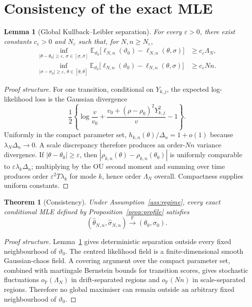 \documentclass[11pt]{article}
\newtheorem{theorem}[assumption]{Theorem}
\newtheorem{lemma}[assumption]{Lemma}
\theoremstyle{remark}
\newcommand{\E}{\mathbb E}
\newcommand{\Pp}{\mathbb P}
\newcommand{\1}{\mathbf 1}
\newcommand{\elln}{\ell_{N,n}}
\newcommand{\LamN}{\Lambda_N}
\newcommand{\vzero}{\vartheta_0}
\begin{document}
\section{Consistency of the exact MLE}

\begin{lemma}[Global Kullback--Leibler separation]\label{lem:KL}
For every $\varepsilon>0$, there exist constants $c_\varepsilon>0$ and $N_\varepsilon$ such that, for $N,n\ge N_\varepsilon$,
\begin{align}
 \inf_{|\theta-\theta_0|\ge\varepsilon,\,\sigma\in[\underline\sigma,\overline\sigma]}
 \E_{\vzero}\big[\elln(\vzero)-\elln(\theta,\sigma)\big]
 &\ge c_\varepsilon\LamN,\label{eq:KL-theta}\\
 \inf_{|\sigma-\sigma_0|\ge\varepsilon,\,\theta\in[\underline\theta,\overline\theta]}
 \E_{\vzero}\big[\elln(\vzero)-\elln(\theta,\sigma)\big]
 &\ge c_\varepsilon Nn.
 \label{eq:KL-sigma}
\end{align}
\end{lemma}

\begin{proof}[Proof structure]
For one transition, conditional on $Y_{k,j}$, the expected log-likelihood loss is the Gaussian divergence
\[
 \frac12\left\{
 \log\frac{v}{v_0}
 +\frac{v_0+(\rho-\rho_0)^2Y_{k,j}^2}{v}-1
 \right\}.
\]
Uniformly in the compact parameter set, $h_{k,n}(\theta)/\Delta_n=1+o(1)$ because $\lambda_N\Delta_n\to0$.  A scale discrepancy therefore produces an order-$Nn$ variance divergence.  If $|\theta-\theta_0|\ge\varepsilon$, then
$|\rho_{k,n}(\theta)-\rho_{k,n}(\theta_0)|$ is uniformly comparable to $\varepsilon\lambda_k\Delta_n$; multiplying by the OU second moment and summing over time produces order $\varepsilon^2T\lambda_k$ for mode $k$, hence order $\LamN$ overall.  Compactness supplies uniform constants.
\end{proof}

\begin{theorem}[Consistency]\label{thm:consistency}
Under Assumption~\ref{ass:regime}, every exact conditional MLE defined by Proposition~\ref{prop:profile} satisfies
\begin{equation}\label{eq:consistency}
 (\widehat\theta_{N,n},\widehat\sigma_{N,n})
 \overset{\Pp}{\longrightarrow}(\theta_0,\sigma_0).
\end{equation}
\end{theorem}

\begin{proof}[Proof structure]
Lemma~\ref{lem:KL} gives deterministic separation outside every fixed neighbourhood of $\vzero$.  The centred likelihood field is a finite-dimensional smooth Gaussian-chaos field.  A covering argument over the compact parameter set, combined with martingale Bernstein bounds for transition scores, gives stochastic fluctuations $o_{\Pp}(\LamN)$ in drift-separated regions and $o_{\Pp}(Nn)$ in scale-separated regions.  Therefore no global maximiser can remain outside an arbitrary fixed neighbourhood of $\vzero$.
\end{proof}
\end{document}
